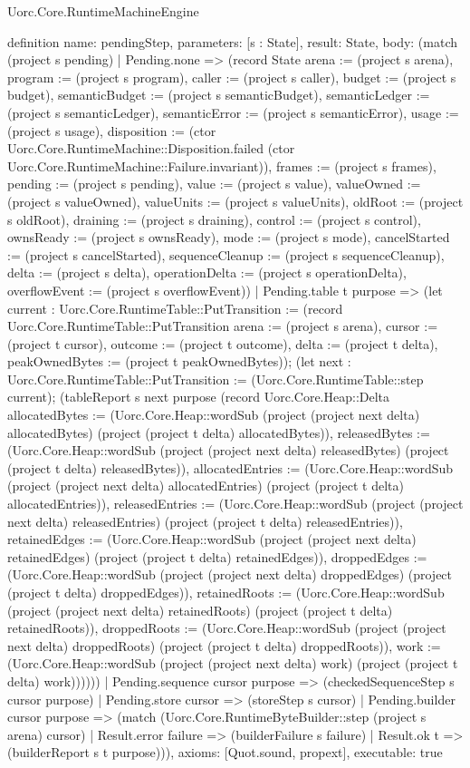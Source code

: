 \begin{lexlean}{Uorc.Core.RuntimeMachineEngine}
\begin{semanticmodule}
definition{
  name: pendingStep,
  parameters: [s : State],
  result: State,
  body: (match (project s pending)
    | Pending.none => (record State {arena := (project s arena), program := (project s program), caller := (project s caller), budget := (project s budget), semanticBudget := (project s semanticBudget), semanticLedger := (project s semanticLedger), semanticError := (project s semanticError), usage := (project s usage), disposition := (ctor Uorc.Core.RuntimeMachine::Disposition.failed (ctor Uorc.Core.RuntimeMachine::Failure.invariant)), frames := (project s frames), pending := (project s pending), value := (project s value), valueOwned := (project s valueOwned), valueUnits := (project s valueUnits), oldRoot := (project s oldRoot), draining := (project s draining), control := (project s control), ownsReady := (project s ownsReady), mode := (project s mode), cancelStarted := (project s cancelStarted), sequenceCleanup := (project s sequenceCleanup), delta := (project s delta), operationDelta := (project s operationDelta), overflowEvent := (project s overflowEvent)})
    | Pending.table t purpose => (let current : Uorc.Core.RuntimeTable::PutTransition := (record Uorc.Core.RuntimeTable::PutTransition {arena := (project s arena), cursor := (project t cursor), outcome := (project t outcome), delta := (project t delta), peakOwnedBytes := (project t peakOwnedBytes)}); (let next : Uorc.Core.RuntimeTable::PutTransition := (Uorc.Core.RuntimeTable::step current); (tableReport s next purpose (record Uorc.Core.Heap::Delta {allocatedBytes := (Uorc.Core.Heap::wordSub (project (project next delta) allocatedBytes) (project (project t delta) allocatedBytes)), releasedBytes := (Uorc.Core.Heap::wordSub (project (project next delta) releasedBytes) (project (project t delta) releasedBytes)), allocatedEntries := (Uorc.Core.Heap::wordSub (project (project next delta) allocatedEntries) (project (project t delta) allocatedEntries)), releasedEntries := (Uorc.Core.Heap::wordSub (project (project next delta) releasedEntries) (project (project t delta) releasedEntries)), retainedEdges := (Uorc.Core.Heap::wordSub (project (project next delta) retainedEdges) (project (project t delta) retainedEdges)), droppedEdges := (Uorc.Core.Heap::wordSub (project (project next delta) droppedEdges) (project (project t delta) droppedEdges)), retainedRoots := (Uorc.Core.Heap::wordSub (project (project next delta) retainedRoots) (project (project t delta) retainedRoots)), droppedRoots := (Uorc.Core.Heap::wordSub (project (project next delta) droppedRoots) (project (project t delta) droppedRoots)), work := (Uorc.Core.Heap::wordSub (project (project next delta) work) (project (project t delta) work))}))))
    | Pending.sequence cursor purpose => (checkedSequenceStep s cursor purpose)
    | Pending.store cursor => (storeStep s cursor)
    | Pending.builder cursor purpose => (match (Uorc.Core.RuntimeByteBuilder::step (project s arena) cursor)
      | Result.error failure => (builderFailure s failure)
      | Result.ok t => (builderReport s t purpose))),
  axioms: [Quot.sound, propext],
  executable: true
}


\end{semanticmodule}
\end{lexlean}
